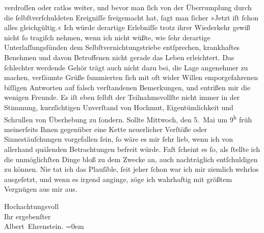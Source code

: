                verdroſſen oder ratlos weiter, und bevor man ſich von der Überrumplung durch die
               ſelbſtverſchuldeten Ereigniſſe freigemacht hat, ſagt man ſicher »Jetzt iſt ſchon
               alles gleichgültig.« Ich würde derartige Erlebniſſe trotz ihrer Wiederkehr gewiß
               nicht ſo tragiſch nehmen, wenn ich nicht wüßte, wie ſehr derartige
               Unterlaſſungsſünden dem Selbſtvernichtungstriebe entſprechen, krankhaftes Benehmen
               und davon Betroffenen nicht gerade das Leben erleichtert. Das ſchlechter werdende
               Gehör trägt auch nicht dazu bei, {\pb}die Lage
               angenehmer zu machen, verſäumte Grüße ſummierten ſich mit oft wider Willen
               emporgefahrenen biſſigen Antworten auf falsch verſtandenen Bemerkungen, und entrißen
               mir die wenigen Freunde. Es iſt eben ſelbſt der Teilnahmsvollſte nicht immer in der
               Stimmung, kurzſichtigen Unverſtand von Hochmut, Eigentümlichkeit und Schrullen von
               Überhebung zu ſondern. Sollte Mittwoch, den 5. Mai um 9\textsuperscript{h} früh meinerſeits Ihnen gegenüber eine Kette
               neuerlicher Verſtöße oder Sinnestäuſchungen vorgefallen ſein, ſo wäre es mir ſehr
               lieb, wenn ich von allerhand quälenden Betrachtungen befreit würde. Faſt ſcheint es
               ſo, als ſtellte ich die unmöglichſten Dinge bloß zu dem Zwecke an, auch nachträglich
               entſchuldigen zu können. Nie tat ich das Plauſible, ſeit jeher ſchon war ich mir
               ziemlich wehrlos ausgeſetzt, und wenn es irgend anginge, zöge ich {\pb}wahrhaftig mit größtem Vergnügen aus mir
               aus.\pend
           
\pstart
           Hochachtungsvoll{\\[\baselineskip]}Ihr ergebenſter{\\[\baselineskip]}\spacefill\mbox{Albert Ehrenstein.}\pend
           \leftskip=0em{}\endnumbering{}  
      